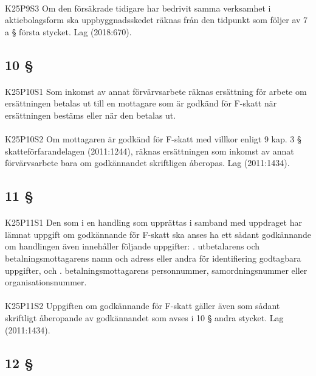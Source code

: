 \documentclass[a4paper,notitlepage,openany,10pt]{book}
\begin{document}
\paragraph*{}
{\tiny K25P9S3}
Om den försäkrade tidigare har bedrivit samma verksamhet i aktiebolagsform ska uppbyggnadsskedet räknas från den tidpunkt som följer av 7 a § första stycket.
Lag (2018:670).
\subsection*{10 §}
\paragraph*{}
{\tiny K25P10S1}
Som inkomst av annat förvärvsarbete räknas ersättning för arbete om ersättningen betalas ut till en mottagare som är godkänd för F-skatt när ersättningen bestäms eller när den betalas ut.
\paragraph*{}
{\tiny K25P10S2}
Om mottagaren är godkänd för F-skatt med villkor enligt 9 kap. 3 § skatteförfarandelagen (2011:1244), räknas ersättningen som inkomst av annat förvärvsarbete bara om godkännandet skriftligen åberopas.
Lag (2011:1434).
\subsection*{11 §}
\paragraph*{}
{\tiny K25P11S1}
Den som i en handling som upprättas i samband med uppdraget har lämnat uppgift om godkännande för F-skatt ska anses ha ett sådant godkännande om handlingen även innehåller följande uppgifter:
. utbetalarens och betalningsmottagarens namn och adress eller andra för identifiering godtagbara uppgifter, och
. betalningsmottagarens personnummer, samordningsnummer eller organisationsnummer.
\paragraph*{}
{\tiny K25P11S2}
Uppgiften om godkännande för F-skatt gäller även som sådant skriftligt åberopande av godkännandet som avses i 10 § andra stycket.
Lag (2011:1434).
\subsection*{12 §}
\end{document}
